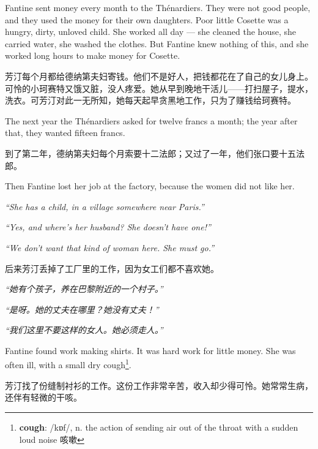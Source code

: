 \documentclass[fontset=ubuntu, zihao=5]{ctexart}
\newcommand\doulos[1]{{\fontspec{Doulos SIL} /#1/}}
\begin{document}
\begin{paracol}{2}
  \sectionbreak

  Fantine sent money every month to the Thénardiers. They were not good
  people, and they used the money for their own daughters. Poor little
  Cosette was a hungry, dirty, unloved child. She worked all day --- she
  cleaned the house, she carried water, she washed the clothes. But Fantine
  knew nothing of this, and she worked long hours to make money for Cosette.

  \switchcolumn

  \sectionbreak

  芳汀每个月都给德纳第夫妇寄钱。他们不是好人，把钱都花在了自己的女儿身上。可怜的小珂赛特又饿又脏，没人疼爱。她从早到晚地干活儿——打扫屋子，提水，洗衣。可芳汀对此一无所知，她每天起早贪黑地工作，只为了赚钱给珂赛特。

  \switchcolumn*

  The next year the Thénardiers asked for twelve francs a month; the year after that, they wanted fifteen francs.

  \switchcolumn

  到了第二年，德纳第夫妇每个月索要十二法郎；又过了一年，他们张口要十五法郎。

  \switchcolumn*

  Then Fantine lost her job at the factory, because the women did not like her.


  \emph{``She has a child, in a village somewhere near Paris.''}


  \emph{``Yes, and where's her husband? She doesn't have one!''}


  \emph{``We don't want that kind of woman here. She must go.''}


  \switchcolumn

  后来芳汀丢掉了工厂里的工作，因为女工们都不喜欢她。


  \emph{“她有个孩子，养在巴黎附近的一个村子。”}


  \emph{“是呀。她的丈夫在哪里？她没有丈夫！”}


  \emph{“我们这里不要这样的女人。她必须走人。”}

  \switchcolumn*

  Fantine found work making shirts. It was hard work for little money. She was
  often ill, with a small dry cough\footnote{\textbf{cough}: \doulos{kɒf}, n.
    the action of sending air out of the throat with a sudden loud noise 咳嗽}.

  \switchcolumn

  芳汀找了份缝制衬衫的工作。这份工作非常辛苦，收入却少得可怜。她常常生病，还伴有轻微的干咳。


\end{paracol}
\end{document}
